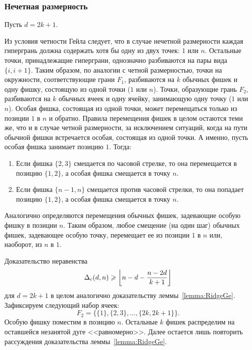 %
%


\subsubsection{Нечетная размерность}

Пусть \(d=2k+1\).

Из условия четности Гейла следует, что в случае нечетной размерности 
каждая гипергрань должна содержать хотя бы одну из двух точек: $1$ или $n$. Остальные точки, принадлежащие гиперграни, однозначно разбиваются на пары вида $\{i,i+1\}$.  Таким образом, по аналогии с четной размерностью, точки на окружности, соответствующие грани $F_1$, разбиваются на $k$ обычных фишек и одну фишку, состоящую из одной точки ($1$ или $n$). Точки, образующие грань $F_2$, разбиваются на $k$ обычных ячеек и одну ячейку, занимающую одну точку ($1$ или $n$).
Особая фишка, состоящая из одной точки, может перемещаться только из позиции $1$ в $n$ и обратно.
Правила перемещения фишек в целом остаются теми же, что и в случае четной размерности, за исключением ситуаций, когда на пути обычной фишки встречается особая, состоящая из одной точки. А именно, пусть особая фишка занимает позицию $1$. Тогда:
\begin{enumerate}
	\item Если фишка $\{2,3\}$ смещается по часовой стрелке, то она перемещается в позицию $\{1,2\}$, а особая фишка смещается в точку $n$.
	\item Если фишка $\{n-1,n\}$ смещается против часовой стрелки, то она попадает позицию $\{1,2\}$, а особая фишка смещается в точку $n$.
\end{enumerate}
Аналогично определяются перемещения обычных фишек, задевающие особую фишку в позиции $n$. Таким образом, любое смещение (на один шаг) обычных фишек, задевающее особую точку, перемещает ее из позиции $1$ в $n$ или, наоборот, из $n$ в $1$.

Доказательство неравенства 
\[{\Delta_{c}(d,n)} \geqslant \left\lfloor n-d - \frac{n-2d}{k+1} \right\rfloor \]
для $d=2k+1$ в целом аналогично доказательству леммы~\ref{lemma:RidgeGe}.
Зафиксируем следующий набор ячеек: \[F_2 = \{\{1\},\{2,3\},\dots,\{2k,2k+1\}\}.\]
Особую фишку поместим в позицию $n$. Остальные $k$ фишек распределим на оставшейся незанятой дуге <<равномерно>>. Далее остается лишь повторить рассуждения доказательства леммы~\ref{lemma:RidgeGe}.

